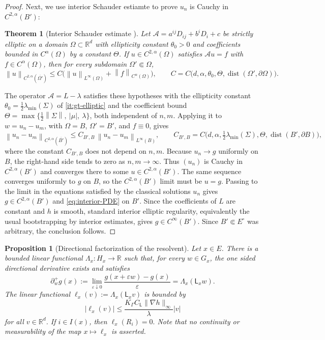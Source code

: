 \documentclass[aihp]{imsart}
\numberwithin{equation}{section}
\theoremstyle{plain}
\newtheorem{theorem}{Theorem}[section]
\newtheorem{proposition}[proposition]{Proposition}
\theoremstyle{definition}
\newcommand{\R}{\mathbb R}
\newcommand{\1}{\mathbf 1}
\newcommand{\norm}[1]{\left\lVert #1\right\rVert}
\newcommand{\abs}[1]{\left\lvert #1\right\rvert}
\begin{document}
\begin{proof}
Next, we use interior Schauder estiamte to prove $u_n$ is Cauchy in $C^{2,\alpha}(B')$:
\begin{theorem}[Interior Schauder estimate {\normalfont \cite[Theorem~6.2]{GilbargTrudinger2001}}]
Let $\mathcal A=a^{ij}D_{ij}+b^iD_i+c$ be strictly elliptic on a domain $\Omega\subset\R^d$ with ellipticity constant $\theta_0>0$ and coefficients bounded in $C^{\alpha}(\Omega)$ by a constant $\Theta$. If $u\in C^{2,\alpha}(\Omega)$ satisfies $\mathcal Au=f$ with $f\in C^{\alpha}(\Omega)$, then for every subdomain $\Omega'\Subset\Omega$,
\[
 \norm{u}_{C^{2,\alpha}(\overline{\Omega'})}
 \le C\bigl(\norm{u}_{L^\infty(\Omega)}+\norm{f}_{C^{\alpha}(\Omega)}\bigr),
 \qquad C=C\bigl(d,\alpha,\theta_0,\Theta,\operatorname{dist}(\Omega',\partial\Omega)\bigr).
\]
\end{theorem}
The operator $\mathcal A=L-\lambda$ satisfies these hypotheses with the ellipticity constant $\theta_0=\tfrac12\lambda_{\min}(\Sigma)$ of \ref{it:gt-elliptic} and the coefficient bound $\Theta=\max\{\tfrac12\norm{\Sigma},\ \abs{\mu},\ \lambda\}$, both independent of $n,m$. Applying it to $w=u_n-u_m$, with $\Omega=B$, $\Omega'=B'$, and $f\equiv0$, gives
\[
 \norm{u_n-u_m}_{C^{2,\alpha}(\overline{B'})}
 \le C_{B',B}\,\norm{u_n-u_m}_{L^\infty(B)},
 \qquad
 C_{B',B}=C\bigl(d,\alpha,\tfrac12\lambda_{\min}(\Sigma),\Theta,\operatorname{dist}(B',\partial B)\bigr),
\]
where the constant $C_{B',B}$ does not depend on $n,m$.
Because $u_n\to g$ uniformly on $B$, the right-hand side tends to zero as $n,m\to\infty$. Thus $(u_n)$ is Cauchy in $C^{2,\alpha}(B')$ and converges there to some $u\in C^{2,\alpha}(B')$. The same sequence converges uniformly to $g$ on $B$, so the $C^{2,\alpha}(B')$ limit must be $u=g$. Passing to the limit in the equations satisfied by the classical solutions $u_n$ gives $g\in C^{2,\alpha}(B')$ and \eqref{eq:interior-PDE} on $B'$. Since the coefficients of $L$ are constant and $h$ is smooth, standard interior elliptic regularity, equivalently the usual bootstrapping by interior estimates, gives $g\in C^\infty(B')$. Since $B'\Subset E^\circ$ was arbitrary, the conclusion follows.
\end{proof}

\begin{proposition}[Directional factorization of the resolvent]\label{prop:resolvent-directional}
Let \(x\in E\). There is a bounded linear functional
\(\Lambda_x:H_x\to \mathbb R\) such that, for every \(w\in G_x\), the one sided
directional derivative exists and satisfies
\begin{equation}
\partial_w^+ g(x)
:=
\lim_{\varepsilon\downarrow0}
\frac{g(x+\varepsilon w)-g(x)}{\varepsilon}
=
\Lambda_x(\mathsf L_xw).
\end{equation}
The linear functional $\ell_x(v):=\Lambda_x(\mathsf L_xv)$ is bounded by
\begin{equation}
|\ell_x(v)|
\le
\frac{K_\Gamma C_{\mathsf L}\|\nabla h\|_\infty}{\lambda}|v|
\end{equation}
for all $v\in \mathbb R^d$. If \(i\in I(x)\), then $\ell_x(R_i)=0.$ Note that no continuity or measurability of the map \(x\mapsto \ell_x\) is asserted.
\end{proposition}
\end{document}
